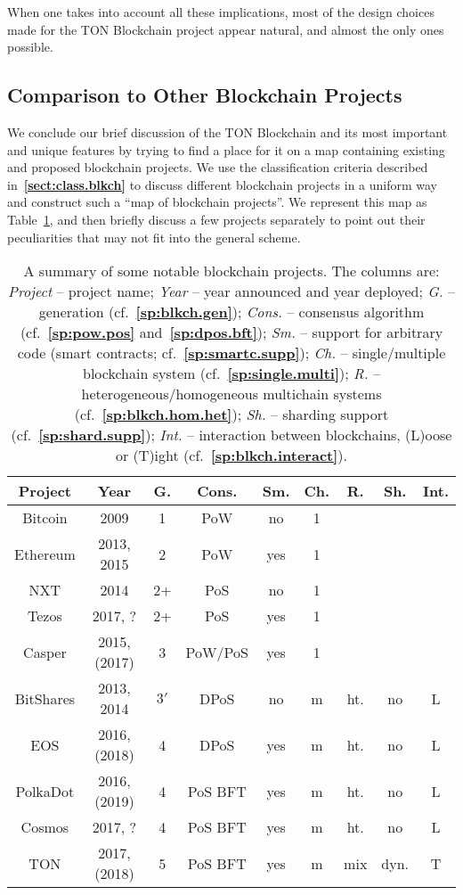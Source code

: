 \documentclass[12pt,oneside]{article}
\def\refpoint#1{{\rm\textbf{\ref{#1}}}}
\let\ptref=\refpoint
\def\mysubsection#1{\subsection{#1}\fancyhead[C]{\small{\textsc{\textrm{\thesubsection.} #1}}}}
\begin{document}
When one takes into account all these implications, most of the design
choices made for the TON Blockchain project appear natural, and almost
the only ones possible.

\mysubsection{Comparison to Other Blockchain
  Projects}\label{sect:compare.blkch}

We conclude our brief discussion of the TON Blockchain and its most
important and unique features by trying to find a place for it on a
map containing existing and proposed blockchain projects. We use the
classification criteria described in~\ptref{sect:class.blkch} to
discuss different blockchain projects in a uniform way and construct
such a ``map of blockchain projects''. We represent this map as
Table~\ref{tab:blkch.proj}, and then briefly discuss a few projects
separately to point out their peculiarities that may not fit into the
general scheme.

\begin{table}
  \captionsetup{font=scriptsize}
  \begin{tabular}{|c|cc|ccc|ccc|}
    \hline Project & Year & G. & Cons. & Sm. & Ch. & R. & Sh. &
    Int. \\ \hline Bitcoin & 2009 & 1 & PoW & no & 1 \\ Ethereum &
    2013, 2015 & 2 & PoW & yes & 1 \\ NXT & 2014 & 2+ & PoS & no & 1
    \\ Tezos & 2017, ? & 2+ & PoS & yes & 1 \\ Casper & 2015, (2017) &
    3 & PoW/PoS & yes & 1 \\ \hline BitShares & 2013, 2014 & $3'$ &
    DPoS & no & m & ht. & no & L \\ EOS & 2016, (2018) & 4 & DPoS &
    yes & m & ht. & no & L \\ PolkaDot & 2016, (2019) & 4 & PoS BFT & yes &
    m & ht. & no & L \\ Cosmos & 2017, ?  & 4 & PoS BFT & yes & m &
    ht. & no & L \\ TON & 2017, (2018) & 5 & PoS BFT & yes & m & mix &
    dyn. & T \\ \hline
  \end{tabular}
  \caption{A summary of some notable blockchain projects. The columns
    are: {\em Project} -- project name; {\em Year} -- year announced
    and year deployed; {\em G.} -- generation
    (cf.~\ptref{sp:blkch.gen}); {\em Cons.} -- consensus algorithm
    (cf.~\ptref{sp:pow.pos} and~\ptref{sp:dpos.bft}); {\em Sm.} --
    support for arbitrary code (smart contracts;
    cf.~\ptref{sp:smartc.supp}); {\em Ch.} -- single/multiple
    blockchain system (cf.~\ptref{sp:single.multi}); {\em R.} --
    heterogeneous/homogeneous multichain systems
    (cf.~\ptref{sp:blkch.hom.het}); {\em Sh.} -- sharding support
    (cf.~\ptref{sp:shard.supp}); {\em Int.} -- interaction between
    blockchains, (L)oose or (T)ight (cf.~\ptref{sp:blkch.interact}).
  }\label{tab:blkch.proj}
\end{table}
\end{document}
